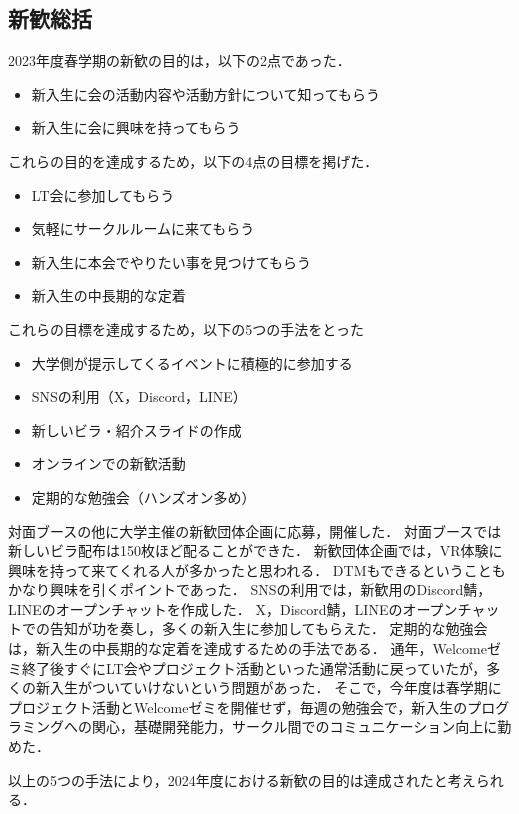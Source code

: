 \subsection*{新歓総括}


2023年度春学期の新歓の目的は，以下の2点であった．

\begin{itemize}
    \item 新入生に会の活動内容や活動方針について知ってもらう
    \item 新入生に会に興味を持ってもらう
\end{itemize}

これらの目的を達成するため，以下の4点の目標を掲げた．

\begin{itemize}
    \item LT会に参加してもらう
    \item 気軽にサークルルームに来てもらう
    \item 新入生に本会でやりたい事を見つけてもらう
    \item 新入生の中長期的な定着
\end{itemize}

これらの目標を達成するため，以下の5つの手法をとった
\begin{itemize}
    \item 大学側が提示してくるイベントに積極的に参加する
    \item SNSの利用（X，Discord，LINE）
    \item 新しいビラ・紹介スライドの作成
    \item オンラインでの新歓活動
    \item 定期的な勉強会（ハンズオン多め）
\end{itemize}

対面ブースの他に大学主催の新歓団体企画に応募，開催した．
対面ブースでは新しいビラ配布は150枚ほど配ることができた．
新歓団体企画では，VR体験に興味を持って来てくれる人が多かったと思われる．
DTMもできるということもかなり興味を引くポイントであった．
SNSの利用では，新歓用のDiscord鯖，LINEのオープンチャットを作成した．
X，Discord鯖，LINEのオープンチャットでの告知が功を奏し，多くの新入生に参加してもらえた．
定期的な勉強会は，新入生の中長期的な定着を達成するための手法である．
通年，Welcomeゼミ終了後すぐにLT会やプロジェクト活動といった通常活動に戻っていたが，多くの新入生がついていけないという問題があった．
そこで，今年度は春学期にプロジェクト活動とWelcomeゼミを開催せず，毎週の勉強会で，新入生のプログラミングへの関心，基礎開発能力，サークル間でのコミュニケーション向上に勤めた．

以上の5つの手法により，2024年度における新歓の目的は達成されたと考えられる．